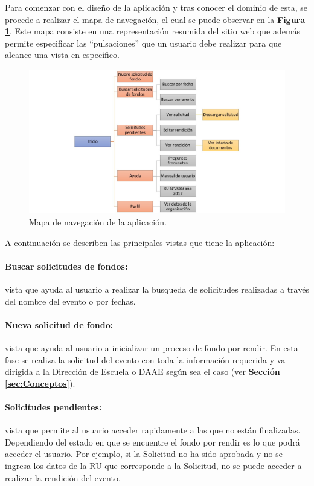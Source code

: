 Para comenzar con el diseño de la aplicación y tras conocer el dominio de esta, se procede a realizar el mapa de navegación, el cual se puede observar en la \textbf{Figura \ref{fig: Mapa_navegacion}}. Este mapa consiste en una representación resumida del sitio web que además permite especificar las ``pulsaciones'' que un usuario debe realizar para que alcance una vista en específico.

\begin{figure}[h!tb]
    \hspace{-9mm}
    \includegraphics[width=1.1\textwidth]{Imagenes/Mapa_de_navegacion.jpg}
    \caption{\label{fig: Mapa_navegacion}Mapa de navegación de la aplicación.}
\end{figure}

A continuación se describen las principales vistas que tiene la aplicación:

\paragraph{Buscar solicitudes de fondos: }vista que ayuda al usuario a realizar la busqueda de solicitudes realizadas a través del nombre del evento o por fechas.

\paragraph{Nueva solicitud de fondo: }vista que ayuda al usuario a inicializar un proceso de fondo por rendir. En esta fase se realiza la solicitud del evento con toda la información requerida y va dirigida a la Dirección de Escuela o DAAE según sea el caso (ver \textbf{Sección \ref{sec:Conceptos}}).

\paragraph{Solicitudes pendientes: }vista que permite al usuario acceder rapidamente a las que no están finalizadas. Dependiendo del estado en que se encuentre el fondo por rendir es lo que podrá acceder el usuario. Por ejemplo, si la Solicitud no ha sido aprobada y no se ingresa los datos de la RU que corresponde a la Solicitud, no se puede acceder a realizar la rendición del evento.

